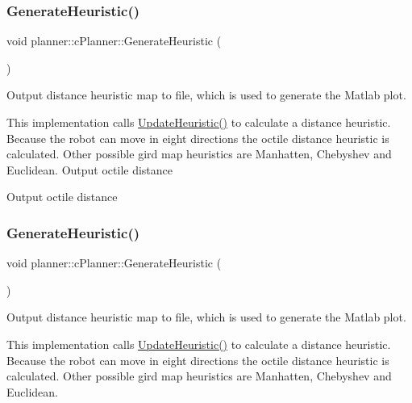 \subsubsection{\texorpdfstring{Generate\+Heuristic()}{GenerateHeuristic()}\hspace{0.1cm}{\footnotesize\ttfamily [1/2]}}
{\footnotesize\ttfamily void planner\+::c\+Planner\+::\+Generate\+Heuristic (\begin{DoxyParamCaption}{ }\end{DoxyParamCaption})}



Output distance heuristic map to file, which is used to generate the Matlab plot. 

This implementation calls \mbox{\hyperlink{classplanner_1_1c_planner_ab7cc7c2666de2e49f745901080aac147}{Update\+Heuristic()}} to calculate a distance heuristic. Because the robot can move in eight directions the octile distance heuristic is calculated. Other possible gird map heuristics are Manhatten, Chebyshev and Euclidean. Output octile distance

Output octile distance \mbox{\label{classplanner_1_1c_planner_a1a4650050656545744796296a653d388}} 
\subsubsection{\texorpdfstring{Generate\+Heuristic()}{GenerateHeuristic()}\hspace{0.1cm}{\footnotesize\ttfamily [2/2]}}
{\footnotesize\ttfamily void planner\+::c\+Planner\+::\+Generate\+Heuristic (\begin{DoxyParamCaption}{ }\end{DoxyParamCaption})}



Output distance heuristic map to file, which is used to generate the Matlab plot. 

This implementation calls \mbox{\hyperlink{classplanner_1_1c_planner_ab7cc7c2666de2e49f745901080aac147}{Update\+Heuristic()}} to calculate a distance heuristic. Because the robot can move in eight directions the octile distance heuristic is calculated. Other possible gird map heuristics are Manhatten, Chebyshev and Euclidean. \mbox{\label{classplanner_1_1c_planner_a6b7554394efd7ad10d76a49b370aa62f}} 
